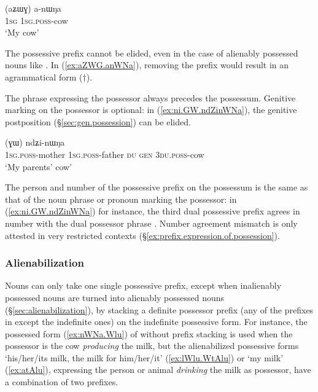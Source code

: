 \begin{exe}
\ex \label{ex:aZWG.anWNa}
\gll (aʑɯɣ) a-nɯŋa \\
\textsc{1sg} \textsc{1sg}.\textsc{poss}-cow \\
\glt `My cow' 
\end{exe}

The possessive prefix cannot be elided, even in the case of alienably possessed nouns like . In (\ref{ex:aZWG.anWNa}), removing the  prefix would result in an agrammatical form ($\dagger$).

The phrase expressing the possessor always precedes the possessum. Genitive marking on the possessor is optional: in (\ref{ex:ni.GW.ndZinWNa}), the genitive postposition  (§\ref{sec:gen.possession}) can be elided.

\begin{exe}
\ex \label{ex:ni.GW.ndZinWNa}
\gll [a-mu a-wa ni] (ɣɯ) ndʑi-nɯŋa \\
\textsc{1sg}.\textsc{poss}-mother \textsc{1sg}.\textsc{poss}-father \textsc{du} \textsc{gen} \textsc{3du}.\textsc{poss}-cow \\
\glt `My parents' cow' 
\end{exe}

The person and number of the possessive prefix on the possessum is the same as that of the noun phrase or pronoun marking the possessor: in (\ref{ex:ni.GW.ndZinWNa}) for instance, the third dual possessive prefix  agrees in number with the dual possessor phrase . Number agreement mismatch is only attested in very restricted contexts (§\ref{ex:prefix.expression.of.possession}).

\subsubsection{Alienabilization} \label{sec:alienabilization.intro}
Nouns can only take one single possessive prefix, except when inalienably possessed nouns are turned into alienably possessed nouns (§\ref{sec:alienabilization}), by stacking a definite possessor prefix (any of the prefixes in  except the indefinite ones) on the indefinite possessive form. For instance, the possessed form  (\ref{ex:nWNa.Wlu}) of  without prefix stacking is used when the possessor is the cow \textit{producing} the milk, but the alienabilized possessive forms  `his/her/its milk, the milk for him/her/it' (\ref{ex:lWlu.WtAlu}) or  `my milk' (\ref{ex:atAlu}), expressing the person or animal \textit{drinking} the milk as possessor, have a combination of two prefixes.

